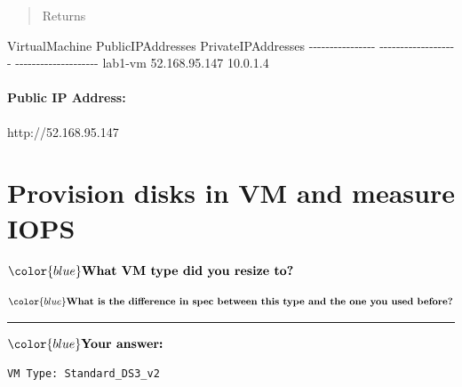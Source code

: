 \documentclass[11pt]{article}
\newenvironment{Shaded}{}{}
\newcommand{\DecValTok}[1]{\textcolor[rgb]{0.25,0.63,0.44}{{#1}}}
\newcommand{\NormalTok}[1]{{#1}}
\newcommand{\OperatorTok}[1]{\textcolor[rgb]{0.40,0.40,0.40}{{#1}}}
\begin{document}
\begin{quote}
Returns
\end{quote}

\begin{Shaded}
\begin{Highlighting}[]
\NormalTok{VirtualMachine    PublicIPAddresses    PrivateIPAddresses}
\OperatorTok{{-}{-}{-}{-}{-}{-}{-}{-}{-}{-}{-}{-}{-}{-}{-}{-}}  \OperatorTok{{-}{-}{-}{-}{-}{-}{-}{-}{-}{-}{-}{-}{-}{-}{-}{-}{-}{-}{-}}  \OperatorTok{{-}{-}{-}{-}{-}{-}{-}{-}{-}{-}{-}{-}{-}{-}{-}{-}{-}{-}{-}{-}}
\NormalTok{lab1{-}vm           }\DecValTok{52.168}\OperatorTok{.}\DecValTok{95.147}        \DecValTok{10.0}\OperatorTok{.}\DecValTok{1.4}
\end{Highlighting}
\end{Shaded}

\paragraph{Public IP Address:}\label{public-ip-address}

http://52.168.95.147

    \section{Provision disks in VM and measure
IOPS}\label{provision-disks-in-vm-and-measure-iops}

    \(\color{blue}\textbf{What VM type did you resize to?}\)

\(\color{blue}\textbf{What is the difference in spec between this type and the one you used before?}\)

\begin{center}\rule{0.5\linewidth}{0.5pt}\end{center}

\(\color{blue} \textbf{Your answer:}\)

\begin{verbatim}
VM Type: Standard_DS3_v2
\end{verbatim}
\end{document}
